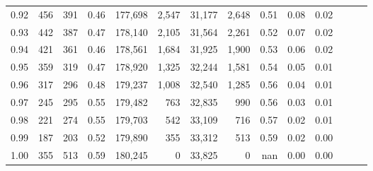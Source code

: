 \begin{tabular}{rrrrrrrrrrrrrr}
0.92 &    456 &  391 &  0.46 &  177,698 &    2,547 &  31,177 &   2,648 &  0.51 &  0.08 &      0.02 \\
0.93 &    442 &  387 &  0.47 &  178,140 &    2,105 &  31,564 &   2,261 &  0.52 &  0.07 &      0.02 \\
0.94 &    421 &  361 &  0.46 &  178,561 &    1,684 &  31,925 &   1,900 &  0.53 &  0.06 &      0.02 \\
0.95 &    359 &  319 &  0.47 &  178,920 &    1,325 &  32,244 &   1,581 &  0.54 &  0.05 &      0.01 \\
0.96 &    317 &  296 &  0.48 &  179,237 &    1,008 &  32,540 &   1,285 &  0.56 &  0.04 &      0.01 \\
0.97 &    245 &  295 &  0.55 &  179,482 &      763 &  32,835 &     990 &  0.56 &  0.03 &      0.01 \\
0.98 &    221 &  274 &  0.55 &  179,703 &      542 &  33,109 &     716 &  0.57 &  0.02 &      0.01 \\
0.99 &    187 &  203 &  0.52 &  179,890 &      355 &  33,312 &     513 &  0.59 &  0.02 &      0.00 \\
1.00 &    355 &  513 &  0.59 &  180,245 &        0 &  33,825 &       0 &   nan &  0.00 &      0.00 \\
\bottomrule
\end{tabular}
